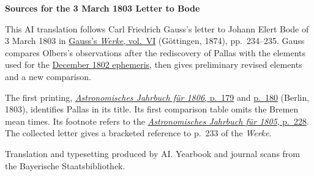 \clearpage\thispagestyle{empty}
\begin{center}\textbf{Sources for the 3 March 1803 Letter to Bode}\end{center}
\noindent This AI translation follows Carl Friedrich Gauss’s letter to Johann Elert Bode of 3 March 1803 in \href{https://gdz.sub.uni-goettingen.de/id/PPN236007467}{Gauss’s \textit{Werke}, vol.~VI} (Göttingen, 1874), pp.~234--235. Gauss compares Olbers’s observations after the rediscovery of Pallas with the elements used for the \href{https://api.digitale-sammlungen.de/iiif/image/v2/bsb10538598_00597/full/1450,/0/default.jpg}{December 1802 ephemeris}, then gives preliminary revised elements and a new comparison.
\par\smallskip\noindent The first printing, \href{https://api.digitale-sammlungen.de/iiif/image/v2/bsb10538335_00189/full/1450,/0/default.jpg}{\textit{Astronomisches Jahrbuch für 1806}, p.~179} and \href{https://api.digitale-sammlungen.de/iiif/image/v2/bsb10538335_00190/full/1450,/0/default.jpg}{p.~180} (Berlin, 1803), identifies Pallas in its title. Its first comparison table omits the Bremen mean times. Its footnote refers to the \href{https://api.digitale-sammlungen.de/iiif/image/v2/bsb10538334_00238/full/1450,/0/default.jpg}{\textit{Astronomisches Jahrbuch für 1805}, p.~228}. The collected letter gives a bracketed reference to p.~233 of the \textit{Werke}.
\par\smallskip\noindent Translation and typesetting produced by AI. Yearbook and journal scans from the Bayerische Staatsbibliothek.
\clearpage
